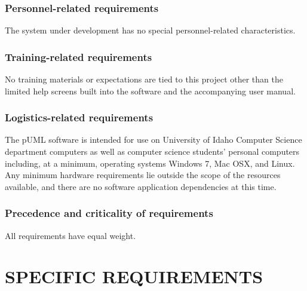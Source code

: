 \documentclass[twoside,letterpaper]{article}
\begin{document}
\subsubsection[Personnel{}-related requirements]{\rmfamily\bfseries\color{black}
Personnel-related requirements}
{\color{black}
The system under development has no special personnel-related
characteristics. }

\subsubsection[Training{}-related requirements]{\rmfamily\bfseries\color{black}
Training-related requirements}
{\color{black}
No training materials or expectations are tied to this project other
than the limited help screens built into the software and the
accompanying user manual.}

\subsubsection[Logistics{}-related requirements]{\rmfamily\bfseries\color{black}
Logistics-related requirements}
{\color{black}
The pUML software is intended for use on University of Idaho Computer Science department computers as well as computer science students' personal computers including, at a minimum, operating systems Windows 7, Mac OSX, and Linux.
Any minimum hardware requirements lie outside the scope of the resources available,
and there are no software application dependencies at this time.
}

\subsubsection[Precedence and criticality of requirements]{\rmfamily\bfseries\color{black}
Precedence and criticality of requirements}
{\color{black}
All requirements have equal weight.}












\clearpage\section[SPECIFIC REQUIREMENTS]{\rmfamily\bfseries\color{black}
SPECIFIC REQUIREMENTS}
\end{document}
